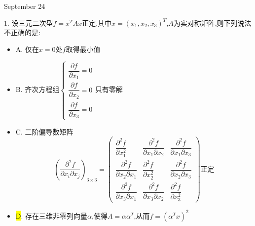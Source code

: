 \textcolor{purplea}{September 24}

1. 设三元二次型$f=x^{T}Ax$正定,其中$x=(x_{1},x_{2},x_{3})^{T}$,$A$为实对称矩阵,则下列说法不正确的是:  
\begin{itemize}
	\item A. 仅在$x=0$处$f$取得最小值
	\item B. 齐次方程组$\left\lbrace
	\begin{array}{l}
		\dfrac{\partial f}{\partial x_{1}}=0\\
		\dfrac{\partial f}{\partial x_{2}}=0\\
		\dfrac{\partial f}{\partial x_{3}}=0
	\end{array}
	\right. $只有零解
	\item C. 二阶偏导数矩阵
	$$\left( \dfrac{\partial^2 f}{\partial x_{i}\partial x_{j}}\right)_{3\times 3}=\left( \begin{matrix}
		\dfrac{\partial^2 f}{\partial x_{1}^2}&\dfrac{\partial^2 f}{\partial x_{1}\partial x_{2}}&\dfrac{\partial^2 f}{\partial x_{1}\partial x_{3}}\\
		\dfrac{\partial^2 f}{\partial x_{2}\partial x_{1}}&\dfrac{\partial^2 f}{\partial x_{2}^2}&\dfrac{\partial^2 f}{\partial x_{2}\partial x_{3}}\\
		\dfrac{\partial^2 f}{\partial x_{3}\partial x_{1}}&\dfrac{\partial^2 f}{\partial x_{3}\partial x_{2}}&\dfrac{\partial^2 f}{\partial x_{3}^2}
	\end{matrix}\right) \text{正定}$$
	\item \hl{D}. 存在三维非零列向量$\alpha$,使得$A=\alpha\alpha^{T}$,从而$f=(\alpha^{T}x)^2$
\end{itemize}
